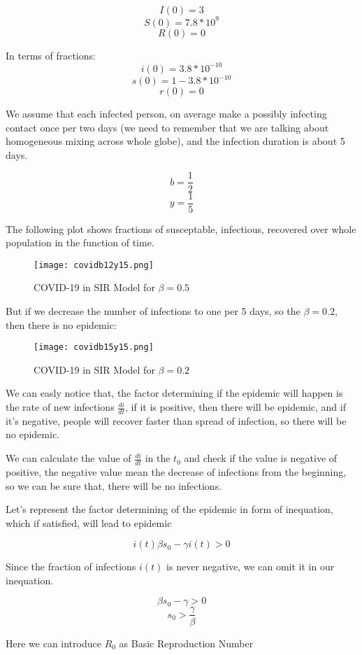 \documentclass[nostrict]{szablonPG}
\begin{document}
\[I(0) = 3\]
\[S(0) = 7.8 * 10^9\]
\[R(0) = 0\]

In terms of fractions:
\[i(0) = 3.8 * 10^{-10}\]
\[s(0) = 1 - 3.8 * 10^{-10}\]
\[r(0) = 0\]

We assume that each infected person, on average make a possibly infecting contact once per two days (we need to remember that we are talking about homogeneous mixing across whole globe), and the infection duration is about 5 days. 

\[b = \frac{1}{2}\]
\[y = \frac{1}{5}\]

The following plot shows fractions of susceptable, infectious, recovered over whole population in the function of time.

\begin{figure}[ht]
\texttt{[image: covidb12y15.png]}
\centering
\caption{COVID-19 in SIR Model for $\beta=0.5$}
\label{fig:covid1}
\end{figure} 


But if we decrease the number of infections to one per 5 days, so the $\beta = 0.2$, then there is no epidemic:

\begin{figure}[ht]
    \texttt{[image: covidb15y15.png]}
    \centering
    \caption{COVID-19 in SIR Model for $\beta=0.2$}
    \label{fig:covid3}
\end{figure} 

We can easly notice that, the factor determining if the epidemic will happen is the rate of new infections $\frac{di}{dt}$, if it is positive, then there will be epidemic, and if it's negative, people will recover faster than spread of infection, so there will be no epidemic.

We can calculate the value of $\frac{di}{dt}$ in the $t_0$ and check if the value is negative of positive, the negative value mean the decrease of infections from the beginning, so we can be sure that, there will be no infections.

Let's represent the factor determining of the epidemic in form of inequation, which if satisfied, will lead to epidemic

\[i(t) \beta s_0 - \gamma i(t) > 0\]

Since the fraction of infections $i(t)$ is never negative, we can omit it in our inequation.

\[\beta s_0 - \gamma > 0\]
\[ s_0 > \frac{\gamma}{\beta}\]

Here we can introduce $R_0$ as Basic Reproduction Number
\end{document}
